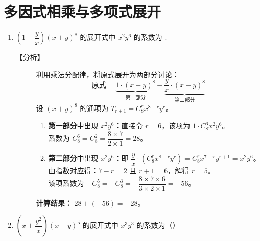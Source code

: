\documentclass[11pt,a4paper]{article}
\newlength{\myspace}             %
\begin{document}
\section{多因式相乘与多项式展开}

\begin{enumerate}[label=\arabic*., start=6, leftmargin=1.5em]

    \item $\left( 1 - \dfrac{y}{x} \right)(x+y)^8$ 的展开式中 $x^2y^6$ 的系数为 \underline{\hspace{2cm}}.     
    \begin{description}
        \item[【分析】] 
        利用乘法分配律，将原式展开为两部分讨论：
        \[ \text{原式} = \underbrace{1 \cdot (x+y)^8}_{\text{第一部分}} - \underbrace{\frac{y}{x} \cdot (x+y)^8}_{\text{第二部分}} \]
        设 $(x+y)^8$ 的通项为 $T_{r+1} = C_8^r x^{8-r} y^r$。
        \begin{enumerate}[label=\textcircled{\small\arabic*}]
            \item \textbf{第一部分}中出现 $x^2y^6$：直接令 $r=6$，该项为 $1 \cdot C_8^6 x^2 y^6$。\\
            系数为 $C_8^6 = C_8^2 = \dfrac{8 \times 7}{2 \times 1} = 28$。
            \item \textbf{第二部分}中出现 $x^2y^6$：即 $\dfrac{y}{x} \cdot (C_8^r x^{8-r} y^r) = C_8^r x^{7-r} y^{r+1} = x^2y^6$。\\
            由指数对应得：$7-r=2$ 且 $r+1=6$，解得 $r=5$。\\
            该项系数为 $-C_8^5 = -C_8^3 = -\dfrac{8 \times 7 \times 6}{3 \times 2 \times 1} = -56$。
        \end{enumerate}
        \textbf{计算结果：} $28 + (-56) = -28$。
    \end{description}

    \vspace{\myspace}

    \item $\left( x + \dfrac{y^2}{x} \right)(x+y)^5$ 的展开式中 $x^3y^3$ 的系数为（\quad）
    

\end{enumerate}
\end{document}
